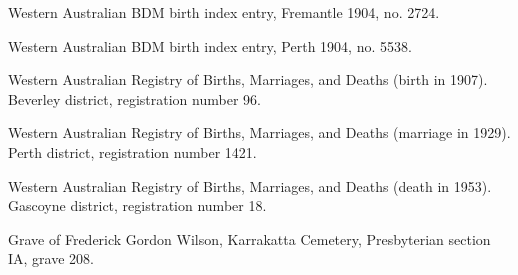 \begin{thebibliography}{999}
	Western Australian BDM birth index entry, Fremantle 1904, no. 2724.

	Western Australian BDM birth index entry, Perth 1904, no. 5538.

	Western Australian Registry of Births, Marriages, and Deaths (birth in 1907). Beverley district, registration number 96.

	Western Australian Registry of Births, Marriages, and Deaths (marriage in 1929). Perth district, registration number 1421.

	Western Australian Registry of Births, Marriages, and Deaths (death in 1953). Gascoyne district, registration number 18.

	Grave of Frederick Gordon Wilson, Karrakatta Cemetery, Presbyterian section IA, grave 208.

\end{thebibliography}
